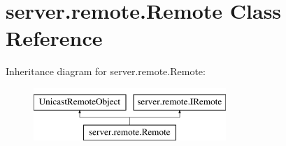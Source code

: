 \hypertarget{classserver_1_1remote_1_1_remote}{}\section{server.\+remote.\+Remote Class Reference}
\label{classserver_1_1remote_1_1_remote}
Inheritance diagram for server.\+remote.\+Remote\+:\begin{figure}[H]
\begin{center}
\leavevmode
\includegraphics[height=2.000000cm]{classserver_1_1remote_1_1_remote}
\end{center}
\end{figure}
